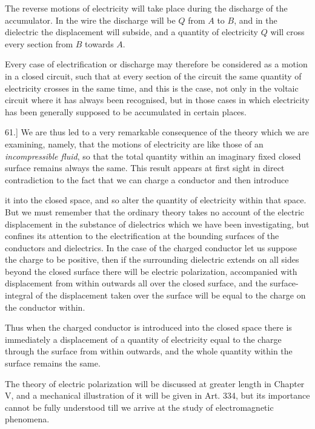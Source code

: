 \documentclass[11pt,a4paper]{article}
\begin{document}
The reverse motions of electricity will take place during the discharge
of the accumulator. In the wire the discharge will be \(Q\) from \(A\)
to \(B\), and in the dielectric the displacement will subside, and a
quantity of electricity \(Q\) will cross every section from \(B\) towards
\(A\).

Every case of electrification or discharge may therefore be considered
as a motion in a closed circuit, such that at every section of the
circuit the same quantity of electricity crosses in the same time, and
this is the case, not only in the voltaic circuit where it has always
been recognised, but in those cases in which electricity has been
generally supposed to be accumulated in certain places.

61.] We are thus led to a very remarkable consequence of the theory
which we are examining, namely, that the motions of electricity are
like those of an \textit{incompressible fluid}, so that the total quantity
within an imaginary fixed closed surface remains always the same.
This result appears at first sight in direct contradiction to the fact
that we can charge a conductor and then introduce

\clearpage
\setcounter{footnote}{0}

it into the closed space, and so alter the quantity of electricity within
that space. But we must remember that the ordinary theory takes no
account of the electric displacement in the substance of dielectrics
which we have been investigating, but confines its attention to the
electrification at the bounding surfaces of the conductors and
dielectrics. In the case of the charged conductor let us suppose the
charge to be positive, then if the surrounding dielectric extends on all
sides beyond the closed surface there will be electric polarization,
accompanied with displacement from within outwards all over the closed
surface, and the surface-integral of the displacement taken over the
surface will be equal to the charge on the conductor within.

Thus when the charged conductor is introduced into the closed space
there is immediately a displacement of a quantity of electricity equal
to the charge through the surface from within outwards, and the whole
quantity within the surface remains the same.

The theory of electric polarization will be discussed at greater length
in Chapter V, and a mechanical illustration of it will be given in
Art. 334, but its importance cannot be fully understood till we arrive
at the study of electromagnetic phenomena.
\end{document}
